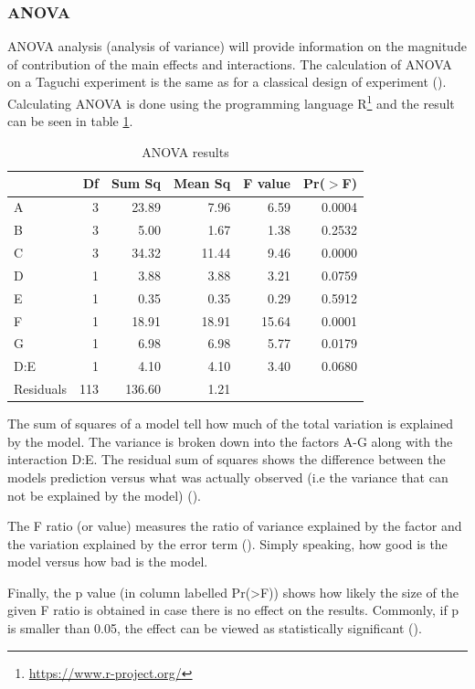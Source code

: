 \subsubsection{ANOVA}
ANOVA analysis (analysis of variance) will provide information on the magnitude of contribution of the main effects and interactions. The calculation of ANOVA on a Taguchi experiment is the same as for a classical design of experiment (\cite{yang_design_2009}). Calculating ANOVA is done using the programming language R\footnote{\href{https://www.r-project.org/}{https://www.r-project.org/}} and the result can be seen in table \ref{tab:taguchi:anova_results}.

\begin{table}[ht]
	\centering
	\begin{tabular}{lrrrrr}
		\hline
		& Df & Sum Sq & Mean Sq & F value & Pr($>$F) \\ 
		\hline
		A & 3 & 23.89 & 7.96 & 6.59 & 0.0004 \\ 
		B & 3 & 5.00 & 1.67 & 1.38 & 0.2532 \\ 
		C & 3 & 34.32 & 11.44 & 9.46 & 0.0000 \\ 
		D & 1 & 3.88 & 3.88 & 3.21 & 0.0759 \\ 
		E & 1 & 0.35 & 0.35 & 0.29 & 0.5912 \\ 
		F & 1 & 18.91 & 18.91 & 15.64 & 0.0001 \\ 
		G & 1 & 6.98 & 6.98 & 5.77 & 0.0179 \\ 
		D:E & 1 & 4.10 & 4.10 & 3.40 & 0.0680 \\ 
		Residuals & 113 & 136.60 & 1.21 &  &  \\ 
		\hline
	\end{tabular}
	\caption{ANOVA results}
	\label{tab:taguchi:anova_results}
\end{table}

The sum of squares of a model tell how much of the total variation is explained by the model. The variance is broken down into the factors A-G along with the interaction D:E. The residual sum of squares shows the difference between the models prediction versus what was actually observed (i.e the variance that can not be explained by the model) (\cite{field_discovering_2012}).

The F ratio (or value) measures the ratio of variance explained by the factor and the variation explained by the error term (\cite{field_discovering_2012}). Simply speaking, how good is the model versus how bad is the model. 

Finally, the p value (in column labelled Pr(>F)) shows how likely the size of the given F ratio is obtained in case there is no effect on the results. Commonly, if p is smaller than 0.05, the effect can be viewed as statistically significant (\cite{field_discovering_2012}).

